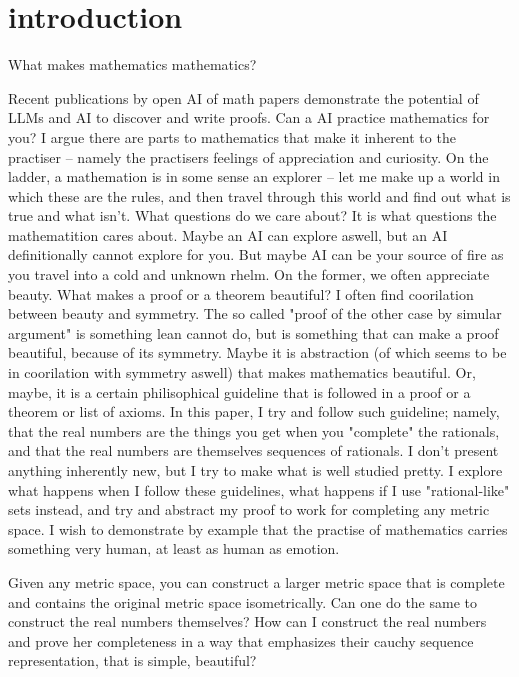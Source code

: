 \newpage
\maketitle


\section{introduction}


What makes mathematics mathematics? 

Recent publications by open AI of math papers demonstrate the potential of LLMs and AI to discover and write proofs. Can a AI practice mathematics for you? I argue there are parts to mathematics that make it inherent to the practiser -- namely the practisers feelings of appreciation and curiosity. On the ladder, a mathemation is in some sense an explorer -- let me make up a world in which these are the rules, and then travel through this world and find out what is true and what isn't. What questions do we care about? It is what questions the mathematition cares about. Maybe an AI can explore aswell, but an AI definitionally cannot explore for you. But maybe AI can be your source of fire as you travel into a cold and unknown rhelm. On the former, we often appreciate beauty. What makes a proof or a theorem beautiful? I often find coorilation between beauty and symmetry. The so called "proof of the other case by simular argument" is something lean cannot do, but is something that can make a proof beautiful, because of its symmetry. Maybe it is abstraction (of which seems to be in coorilation with symmetry aswell) that makes mathematics beautiful. Or, maybe, it is a certain philisophical guideline that is followed in a proof or a theorem or list of axioms. 
In this paper, I try and follow such guideline; namely, that the real numbers are the things you get when you "complete" the rationals, and that the real numbers are themselves sequences of rationals. I don't present anything inherently new, but I try to make what is well studied pretty. I explore what happens when I follow these guidelines, what happens if I use "rational-like" sets instead, and try and abstract my proof to work for completing any metric space. I wish to demonstrate by example that the practise of mathematics carries something very human, at least as human as emotion. 

Given any metric space, you can construct a larger metric space that is complete and contains the original metric space isometrically. Can one do the same to construct the real numbers themselves? How can I construct the real numbers and prove her completeness in a way that emphasizes their cauchy sequence representation, that is simple, beautiful? 


